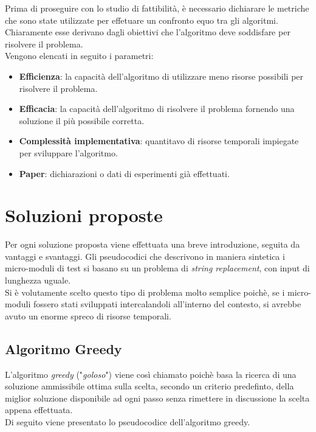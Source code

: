 \noindent Prima di proseguire con lo studio di fattibilità, è necessario dichiarare le metriche che sono state
utilizzate per effetuare un confronto equo tra gli algoritmi. Chiaramente esse derivano dagli obiettivi che
l'algoritmo deve soddisfare per risolvere il problema.\\
Vengono elencati in seguito i parametri:
\begin{itemize}
    \item \textbf{Efficienza}: la capacità dell'algoritmo di utilizzare meno risorse possibili per risolvere il problema.
    \item \textbf{Efficacia}: la capacità dell'algoritmo di risolvere il problema fornendo una soluzione il più possibile corretta.
    \item \textbf{Complessità implementativa}: quantitavo di risorse temporali impiegate per sviluppare l'algoritmo.
    \item \textbf{Paper}: dichiarazioni o dati di esperimenti già effettuati.
\end{itemize}

\section{Soluzioni proposte}
\noindent Per ogni soluzione proposta viene effettuata una breve introduzione, seguita da vantaggi e svantaggi.
Gli pseudocodici che descrivono in maniera sintetica i micro-moduli di test si basano su un problema di \textit{string replacement},
con input di lunghezza uguale.\\
Si è volutamente scelto questo tipo di problema molto semplice poichè, se i micro-moduli fossero stati sviluppati intercalandoli all'interno del contesto,
si avrebbe avuto un enorme spreco di risorse temporali.

\subsection{Algoritmo Greedy}
\noindent L'algoritmo \textit{greedy} ("\textit{goloso}") viene così chiamato poichè basa la ricerca di una
soluzione ammissibile ottima sulla scelta, secondo un criterio predefinto, della miglior soluzione disponibile ad ogni passo senza
rimettere in discussione la scelta appena effettuata.\\
Di seguito viene presentato lo pseudocodice dell'algoritmo greedy.

